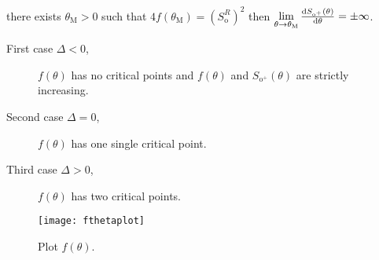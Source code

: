 \documentclass[
    8pt,
    aspectratio=1610,
    c,
    intlimits,
    leqno,
    professionalfonts,
]{beamer}
\begin{document}
\begin{frame}
\begin{enumerate}[i.]
		      there exists $\theta_{\text{M}}>0$ such that $4f\left(\theta_{\text{M}}\right)={\left(S^{R}_{\text{o}}\right)}^{2}$ then
		      \begin{math}
			      \lim\limits_{\theta\to\theta_{\text{M}}}
			      \diff{S_{\text{o}^{+}}\left(\theta\right)}{\theta}=
			      \pm\infty
		      \end{math}.

		      \begin{description}
			      \item[First case $\Delta<0$,]

			            $f\left(\theta\right)$ has no critical points and $f\left(\theta\right)$ and $S_{\text{o}^{+}}\left(\theta\right)$ are strictly increasing.



			      \item[Second case $\Delta=0$,]
			            $f\left(\theta\right)$ has one single critical point.

			      \item[Third case $\Delta>0$,]

			            $f\left(\theta\right)$ has two critical points.
		      \end{description}
	\end{enumerate}
\end{frame}

\begin{frame}
	\begin{figure}[ht!]
		\centering
		\texttt{[image: fthetaplot]}
		\caption{Plot $f\left(\theta\right)$.}
	\end{figure}
\end{frame}
\end{document}
